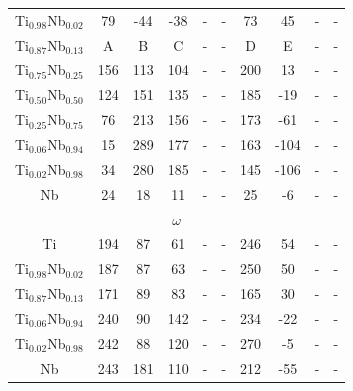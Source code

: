 \begin{longtable}[H]{ c c c c c c c c c c }
	Ti$_{0.98}$Nb$_{0.02}$ & 79 & -44 & -38 & - & - & 73 & 45 & - & - \\
	Ti$_{0.87}$Nb$_{0.13}$ & A & B & C & - & - & D & E & - & - \\
	Ti$_{0.75}$Nb$_{0.25}$ & 156 & 113 & 104 & - & - & 200 & 13 & - & - \\
	Ti$_{0.50}$Nb$_{0.50}$ & 124 & 151 & 135 & - & - & 185 & -19 & - & - \\
	Ti$_{0.25}$Nb$_{0.75}$ & 76 & 213 & 156 & - & - & 173 & -61 & - & - \\
	Ti$_{0.06}$Nb$_{0.94}$ & 15 & 289 & 177 & - & - & 163 & -104 & - & - \\
	Ti$_{0.02}$Nb$_{0.98}$ & 34 & 280 & 185 & - & - & 145 & -106 & - & - \\
	Nb & 24 & 18 & 11 & - & - & 25 & -6 & - & - \\
	\hline
	\multicolumn{10}{c}{$\omega$}\\
	Ti & 194 & 87 & 61 & - & - & 246 & 54 & - & - \\
	Ti$_{0.98}$Nb$_{0.02}$ & 187 & 87 & 63 & - & - & 250 & 50 & - & - \\
	Ti$_{0.87}$Nb$_{0.13}$ & 171 & 89 & 83 & - & - & 165 & 30 & - & - \\
	Ti$_{0.06}$Nb$_{0.94}$ & 240 & 90 & 142 & - & - & 234 & -22 & - & - \\
	Ti$_{0.02}$Nb$_{0.98}$ & 242 & 88 & 120 & - & - & 270 & -5 & - & - \\
	Nb & 243 & 181 & 110 & - & - & 212 & -55 & - & - \\
	\hline
\end{longtable}

